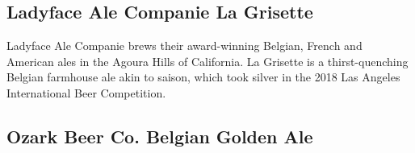 \part{\stylebelgianandfrenchale}

\chapter*{Ladyface Ale Companie La Grisette}

\begin{aboutblock}
Ladyface Ale Companie brews their award-winning Belgian, French and American
ales in the Agoura Hills of California. La Grisette is a thirst-quenching
Belgian farmhouse ale akin to saison, which took silver in the 2018 Las Angeles
International Beer Competition.
\end{aboutblock}


\begin{methodandtiming}
 
\begin{mashsteps}
\end{mashsteps}

\end{methodandtiming}

\pagebreak

\begin{ingredientsblock}

\begin{malts}
\end{malts}

\begin{hops}
\end{hops}

\begin{yeasts}
\end{yeasts}

\end{ingredientsblock}

\chapter*{Ozark Beer Co. Belgian Golden Ale}

